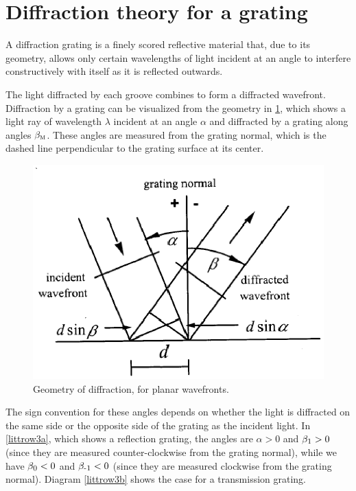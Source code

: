     \section{Diffraction theory for a grating}\label{gratingtheory}
A diffraction grating is a finely scored reflective material that, due to its geometry, allows only certain wavelengths of light incident at an angle to interfere constructively with itself as it is reflected outwards.

 The light diffracted by each groove combines to form a diffracted wavefront. Diffraction by a grating can be visualized from the geometry in \cref{littrow4}, which shows a light ray of wavelength $\lambda$ incident at an angle $\alpha$ and diffracted by a grating along angles $\beta_{\mbox{\footnotesize{\scshape{m}}}}$. These angles are measured from the grating normal, which is the dashed line perpendicular to the grating surface at its center. 
\begin{figure}[!tpb]\centering
\includegraphics[width=\linewidth, draft=\foto]{eps/littrow4.eps}
\caption{Geometry of diffraction, for planar wavefronts.}
\label{littrow4}
\end{figure}
The sign convention for these angles depends on whether the light is diffracted on the same side or the opposite side of the grating as the incident light. In \cref{littrow3a}, which shows a reflection grating, the angles are  $\alpha>0$ and $\beta_{\mbox{\footnotesize{\scshape{1}}}}>0$ (since they are measured counter-clockwise from the grating normal), while we have $\beta_{\mbox{\footnotesize{\scshape{0}}}}<0$ and $\beta_{\mbox{\footnotesize{\scshape{-1}}}}<0$ (since they are measured clockwise from the grating normal). Diagram \cref{littrow3b} shows the case for a transmission grating.
